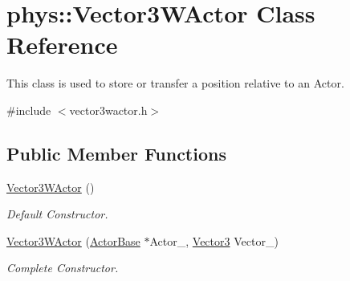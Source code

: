 \hypertarget{classphys_1_1Vector3WActor}{
\section{phys::Vector3WActor Class Reference}
\label{d2/de8/classphys_1_1Vector3WActor}
}


This class is used to store or transfer a position relative to an Actor.  




{\ttfamily \#include $<$vector3wactor.h$>$}

\subsection*{Public Member Functions}
\begin{DoxyCompactItemize}
\item 
\hyperlink{classphys_1_1Vector3WActor_a910f3ee25e7f654e7ba3bedb9942c8f7}{Vector3WActor} ()
\begin{DoxyCompactList}\small\item\em Default Constructor. \item\end{DoxyCompactList}\item 
\hyperlink{classphys_1_1Vector3WActor_ac87c4c55b9260f47f56fb01b6f061ded}{Vector3WActor} (\hyperlink{classphys_1_1ActorBase}{ActorBase} $\ast$Actor\_\-, \hyperlink{classphys_1_1Vector3}{Vector3} Vector\_\-)
\begin{DoxyCompactList}\small\item\em Complete Constructor. \item\end{DoxyCompactList}\end{DoxyCompactItemize}
